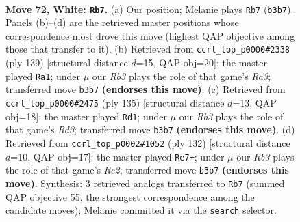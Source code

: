\documentclass[11pt]{article}
\begin{document}
\clearpage

\begin{figure}[p]\centering
\begin{subfigure}{0.46\textwidth}\centering
\resizebox{\linewidth}{!}{%
\newchessgame
\chessboard[
  setfen={6k1/6p1/2N2p2/7p/3P3P/1R4PK/3r4/8 w - - 37 72},
  showmover=false,
  pgfstyle=straightmove, color=movearrow, markmove={b3-b7}
]}
\caption{}
\end{subfigure}\hfill
\begin{subfigure}{0.46\textwidth}\centering
\resizebox{\linewidth}{!}{%
\newchessgame
\chessboard[
  setfen={8/7R/r3pk2/6p1/6Pp/7P/5PK1/8 b - - 45 70},
  showmover=false,
  pgfstyle=straightmove, color=movearrow, markmove={a6-a1}
]}
\caption{}
\end{subfigure}
\\[4pt]
\begin{subfigure}{0.46\textwidth}\centering
\resizebox{\linewidth}{!}{%
\newchessgame
\chessboard[
  setfen={8/5pk1/3r3p/2R3pP/6P1/5P2/6K1/8 b - - 10 68},
  showmover=false,
  pgfstyle=straightmove, color=movearrow, markmove={d6-d1}
]}
\caption{}
\end{subfigure}\hfill
\begin{subfigure}{0.46\textwidth}\centering
\resizebox{\linewidth}{!}{%
\newchessgame
\chessboard[
  setfen={8/6k1/5p2/6pp/8/r4P1P/4R1PK/8 w - - 4 67},
  showmover=false,
  pgfstyle=straightmove, color=movearrow, markmove={e2-e7}
]}
\caption{}
\end{subfigure}
\caption{\textbf{Move 72, White: \texttt{Rb7}.} (a) Our position; Melanie plays \texttt{Rb7} (\texttt{b3b7}). Panels (b)--(d) are the retrieved master positions whose correspondence most drove this move (highest QAP objective among those that transfer to it). (b) Retrieved from \texttt{ccrl\_top\_p0000\#2338} (ply 139) [structural distance $d$=15, QAP obj=20]: the master played \texttt{Ra1}; under $\mu$ our \emph{Rb3} plays the role of that game's \emph{Ra3}; transferred move \texttt{b3b7} \textbf{(endorses this move)}. (c) Retrieved from \texttt{ccrl\_top\_p0000\#2475} (ply 135) [structural distance $d$=13, QAP obj=18]: the master played \texttt{Rd1}; under $\mu$ our \emph{Rb3} plays the role of that game's \emph{Rd3}; transferred move \texttt{b3b7} \textbf{(endorses this move)}. (d) Retrieved from \texttt{ccrl\_top\_p0002\#1052} (ply 132) [structural distance $d$=10, QAP obj=17]: the master played \texttt{Re7+}; under $\mu$ our \emph{Rb3} plays the role of that game's \emph{Re2}; transferred move \texttt{b3b7} \textbf{(endorses this move)}. Synthesis: 3 retrieved analogs transferred to \texttt{Rb7} (summed QAP objective 55, the strongest correspondence among the candidate moves); Melanie committed it via the \texttt{search} selector.}
\label{fig:thought-m142}
\end{figure}
\end{document}
